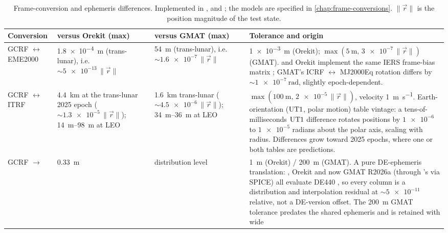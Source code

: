 \begin{table}[htbp]
  \centering
  \caption{Frame-conversion and ephemeris differences. Implemented in
    ,
     and
    ; the models are
    specified in \cref{chap:frame-conversions}. $\lVert\vec r\rVert$ is the
    position magnitude of the test state.}
  \label{tab:xval-frames}
  \scriptsize
  \begin{tabularx}{\textwidth}{@{}l L L L@{}}
    \toprule
    Conversion & versus Orekit (max) & versus GMAT (max) & Tolerance and origin \\
    \midrule
    GCRF $\leftrightarrow$ EME2000 &
      \SI{1.8e-4}{\meter} (trans-lunar), i.e.\
      ${\sim}\num{5e-13}\,\lVert\vec r\rVert$ &
      \SI{54}{\meter} (trans-lunar), i.e.\
      ${\sim}\num{1.6e-7}\,\lVert\vec r\rVert$ &
      \SI{1e-3}{\meter} (Orekit);
      $\max(\SI{5}{\meter},\, \num{3e-7}\,\lVert\vec r\rVert)$ (GMAT).
      \lupnt{} and Orekit implement the same IERS frame-bias matrix
      \citep{iers2010}; GMAT's ICRF $\leftrightarrow$ MJ2000Eq rotation
      differs by ${\sim}\SI{1e-7}{\radian}$, slightly epoch-dependent. \\
    GCRF $\leftrightarrow$ ITRF &
      \SI{4.4}{\kilo\meter} at the trans-lunar 2025 epoch
      (${\sim}\num{1.3e-5}\,\lVert\vec r\rVert$);
      \SIrange{14}{98}{\meter} at LEO &
      \SI{1.6}{\kilo\meter} trans-lunar
      (${\sim}\num{4.5e-6}\,\lVert\vec r\rVert$);
      \SIrange{34}{36}{\meter} at LEO &
      $\max(\SI{100}{\meter},\, \num{2e-5}\,\lVert\vec r\rVert)$, velocity
      \SI{1}{\meter\per\second}. Earth-orientation ($\mathrm{UT1}$, polar motion)
      table vintage: a tens-of-milliseconds $\mathrm{UT1}$ difference rotates
      positions by $\num{1e-6}$ to $\num{1e-5}$ radians about the polar axis,
      scaling with radius. Differences grow toward 2025 epochs, where one or
      both tables are predictions. \\
    GCRF $\rightarrow$ \code{MOON\_CI} &
      \SI{0.33}{\meter} & distribution level &
      \SI{1}{\meter} (Orekit) / \SI{200}{\meter} (GMAT). A pure DE-ephemeris
      translation: \lupnt{}, Orekit and now GMAT R2026a (through \lupnt{}'s
      \file{de440.bsp} via SPICE) all evaluate DE440 \citep{park2021de440}, so
      every column is a distribution and interpolation residual at
      ${\sim}\num{5e-11}$ relative, not a DE-version offset. The \SI{200}{\meter}
      GMAT tolerance predates the shared ephemeris and is retained with wide

\end{tabularx}
\end{table}

